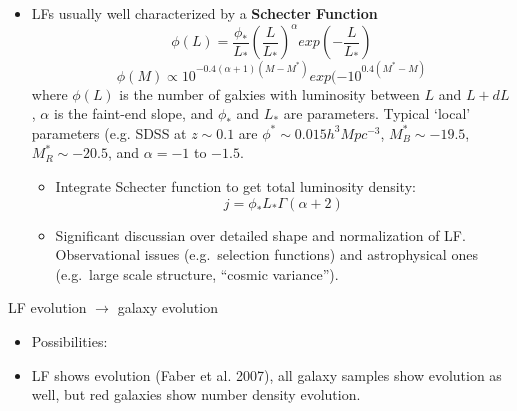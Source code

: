 \documentclass[12pt]{article}
\begin{document}
\begin{itemize}
      \item LFs usually well characterized by a \textbf{Schecter Function}
          \begin{equation}
              \phi(L) =
              \frac{\phi_*}{L_*}(\frac{L}{L_*})^{\alpha}exp(-\frac{L}{L_*})
          \end{equation}
          \begin{equation}
            \phi(M) \propto 10^{-0.4(\alpha+1)(M-M^*)}exp(-10^{0.4(M^*-M)}
          \end{equation}
      where $\phi(L)$ is the number of galxies with luminosity between
      $L$ and $L + dL$, $\alpha$ is the faint-end slope, and $\phi_*$
      and $L_*$ are parameters. Typical `local' parameters (e.g. SDSS
      at $z \sim 0.1$ are $\phi^*\sim0.015h^3Mpc^{-3}$,
      $M_B^*\sim-19.5$, $M_R^*\sim-20.5$, and $\alpha=-1$ to $-1.5$.
      \begin{itemize}
        \item Integrate Schecter function to get total luminosity
            density:
            \begin{equation}
              j = \phi_*L_*\Gamma(\alpha + 2)
            \end{equation}
        \item Significant discussian over detailed shape and
            normalization of LF\@. Observational issues (e.g.\ selection
            functions) and astrophysical ones (e.g.\ large scale structure,
            ``cosmic variance'').
      \end{itemize}
\end{itemize}
LF evolution $\rightarrow$ galaxy evolution
\begin{itemize}
      \item Possibilities:
      \item LF shows evolution (Faber et al. 2007), all galaxy samples
          show evolution as well, but red galaxies show number density
          evolution.
\end{itemize}
\end{document}
